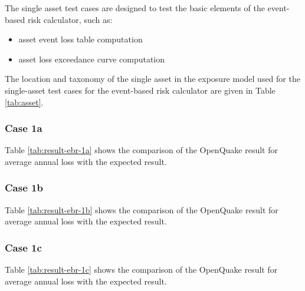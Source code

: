 The single asset test cases are designed to test the basic elements of the event-based risk calculator, such as:

\begin{itemize}
\item asset event loss table computation
\item asset loss exceedance curve computation
\end{itemize}

The location and taxonomy of the single asset in the exposure model used for the single-asset test cases for the event-based risk calculator are given in Table \ref{tab:asset}.

\subsubsection{Case 1a}


Table \ref{tab:result-ebr-1a} shows the comparison of the OpenQuake result for average annual loss with the expected result.

\subsubsection{Case 1b}


Table \ref{tab:result-ebr-1b} shows the comparison of the OpenQuake result for average annual loss with the expected result.

\subsubsection{Case 1c}


Table \ref{tab:result-ebr-1c} shows the comparison of the OpenQuake result for average annual loss with the expected result.
